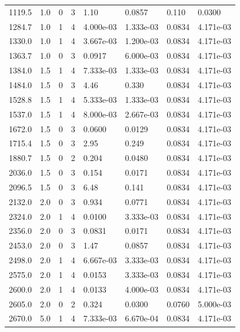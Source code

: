 \documentclass[preview]{standalone}
\begin{document}
{{\begin{tabular}{L{1.2cm}C{1.2cm} C{0.3cm}C{0.5cm} C{1.4cm}C{1.4cm} C{1.4cm}C{1.4cm}}
  1119.5  &   1.0  & 0     &  3 &  1.10  & 0.0857  & 0.110 &  0.0300   \\ 
  1284.7  &   1.0  & 1     &  4 &  4.000e-03  & 1.333e-03  & 0.0834 &  4.171e-03   \\ 
  1330.0  &   1.0  & 1     &  4 &  3.667e-03  & 1.200e-03  & 0.0834 &  4.171e-03   \\ 
  1363.7  &   1.0  & 0     &  3 &  0.0917  & 6.000e-03  & 0.0834 &  4.171e-03   \\ 
  1384.0  &   1.5  & 1     &  4 &  7.333e-03  & 1.333e-03  & 0.0834 &  4.171e-03   \\ 
  1484.0  &   1.5  & 0     &  3 &  4.46  & 0.330  & 0.0834 &  4.171e-03   \\ 
  1528.8  &   1.5  & 1     &  4 &  5.333e-03  & 1.333e-03  & 0.0834 &  4.171e-03   \\ 
  1537.0  &   1.5  & 1     &  4 &  8.000e-03  & 2.667e-03  & 0.0834 &  4.171e-03   \\ 
  1672.0  &   1.5  & 0     &  3 &  0.0600  & 0.0129  & 0.0834 &  4.171e-03   \\ 
  1715.4  &   1.5  & 0     &  3 &  2.95  & 0.249  & 0.0834 &  4.171e-03   \\ 
  1880.7  &   1.5  & 0     &  2 &  0.204  & 0.0480  & 0.0834 &  4.171e-03   \\ 
  2036.0  &   1.5  & 0     &  3 &  0.154  & 0.0171  & 0.0834 &  4.171e-03   \\ 
  2096.5  &   1.5  & 0     &  3 &  6.48  & 0.141  & 0.0834 &  4.171e-03   \\ 
  2132.0  &   2.0  & 0     &  3 &  0.934  & 0.0771  & 0.0834 &  4.171e-03   \\ 
  2324.0  &   2.0  & 1     &  4 &  0.0100  & 3.333e-03  & 0.0834 &  4.171e-03   \\ 
  2356.0  &   2.0  & 0     &  3 &  0.0831  & 0.0171  & 0.0834 &  4.171e-03   \\ 
  2453.0  &   2.0  & 0     &  3 &  1.47  & 0.0857  & 0.0834 &  4.171e-03   \\ 
  2498.0  &   2.0  & 1     &  4 &  6.667e-03  & 3.333e-03  & 0.0834 &  4.171e-03   \\ 
  2575.0  &   2.0  & 1     &  4 &  0.0153  & 3.333e-03  & 0.0834 &  4.171e-03   \\ 
  2600.0  &   2.0  & 1     &  4 &  0.0133  & 4.000e-03  & 0.0834 &  4.171e-03   \\ 
  2605.0  &   2.0  & 0     &  2 &  0.324  & 0.0300  & 0.0760 &  5.000e-03   \\ 
  2670.0  &   5.0  & 1     &  4 &  7.333e-03  & 6.670e-04  & 0.0834 &  4.171e-03   \\ 

\end{tabular}}}
\end{document}
